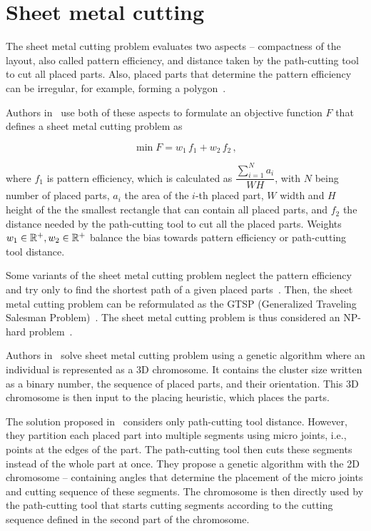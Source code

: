 \newpage
\section{Sheet metal cutting}\label{sec:sheet-metal-cutting}

The sheet metal cutting problem evaluates two aspects – compactness of the layout, also called pattern efficiency, and distance taken
by the path-cutting tool to cut all placed parts.
Also, placed parts that determine the pattern efficiency can be irregular, for example, forming a polygon~\cite{hajadLaserCuttingPath2019}.

Authors in~\cite{vijayanandHeuristicGeneticApproach2015}
use both of these aspects to formulate an objective function $F$ that defines a sheet metal cutting problem as

\begin{equation}
    \min F = w_1\,f_1 + w_2\,f_{2}\,,
    \label{eq:metal-sheet-cutting}
\end{equation}

where $f_1$ is pattern efficiency, which is calculated as $\dfrac{\sum\limits_{i=1}^{N}a_i}{WH}$,
with $N$ being number of placed parts, $a_i$ the area of the $i$-th placed part, $W$ width and $H$ height of the
the smallest rectangle that can contain all placed parts, and $f_2$ the distance
needed by the path-cutting tool to cut all the placed parts.
Weights $w_1 \in \operatorname*{\mathbb{R}^+}, w_2 \in \operatorname*{\mathbb{R}^+}$ balance the bias towards pattern efficiency or path-cutting tool distance.

Some variants of the sheet metal cutting problem neglect the pattern efficiency and try only to find the shortest
path of a given placed parts~\cite{kandasamyEffectiveLocationMicro2020}.
Then, the sheet metal cutting problem can be reformulated as the GTSP (Generalized Traveling Salesman Problem)~\cite{hajadLaserCuttingPath2019}.
The sheet metal cutting problem is thus considered an NP-hard problem~\cite{vijayanandHeuristicGeneticApproach2015}.

Authors in~\cite{vijayanandHeuristicGeneticApproach2015} solve sheet metal cutting problem using a genetic algorithm
where an individual is represented as a 3D chromosome.
It contains the cluster size written as a binary number, the sequence of placed parts, and their orientation.
This 3D chromosome is then input to the placing heuristic, which places the parts.

The solution proposed in~\cite{kandasamyEffectiveLocationMicro2020} considers only path-cutting tool distance.
However, they partition each placed part into multiple segments using micro joints, i.e., points at the edges of the part.
The path-cutting tool then cuts these segments instead of the whole part at once.
They propose a genetic algorithm with the 2D chromosome – containing angles that determine the placement of the micro joints and cutting sequence of these segments.
The chromosome is then directly used by the path-cutting tool that starts cutting segments according to the cutting sequence defined in the second part of the chromosome.
